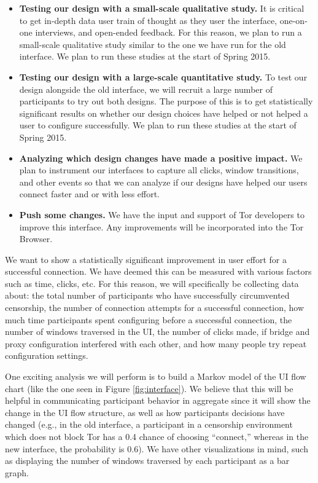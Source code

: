 \documentclass{template}
\begin{document}
\begin{itemize} \itemsep1pt \parskip0pt  
\item {\bfseries Testing our design with a small-scale qualitative study.} It is critical to get in-depth data user train of thought as they user the interface, one-on-one interviews, and open-ended feedback. For this reason, we plan to run a small-scale qualitative study similar to the one we have run for the old interface. We plan to run these studies at the start of Spring 2015. 
\item {\bfseries Testing our design with a large-scale quantitative study.} To test our design alongside the old interface, we will recruit a large number of participants to try out both designs. The purpose of this is to get statistically significant results on whether our design choices have helped or not helped a user to configure successfully. We plan to run these studies at the start of Spring 2015.
\item {\bfseries Analyzing which design changes have made a positive impact.} We plan to instrument our interfaces to capture all clicks, window transitions, and other events so that we can analyze if our designs have helped our users connect faster and or with less effort. 
\item {\bfseries Push some changes.} We have the input and support of Tor developers
to improve this interface. Any improvements will be incorporated into the Tor Browser.
\end{itemize}

 We want to show a statistically significant improvement in user effort for a successful connection. We have deemed this can be measured with various factors such as time, clicks, etc. For this reason, we will specifically be collecting data about: the total number of participants who have successfully circumvented censorship, the number of connection attempts for a successful connection, how much time participants spent configuring before a successful connection, the number of windows traversed in the UI, the number of clicks made, if bridge and proxy configuration interfered with each other, and how many people try repeat configuration settings. 

One exciting analysis we will perform is to build a Markov model of the UI flow chart (like the one seen in Figure \ref{fig:interface}). We believe that this will be helpful in communicating participant behavior in aggregate since it will show the change in the UI flow structure, as well as how participants decisions have changed (e.g., in the old interface, a participant in a censorship environment which does not block Tor has a 0.4 chance of choosing ``connect,'' whereas in the new interface, the probability is 0.6). We have other visualizations in mind, such as displaying the number of windows traversed by each participant as a bar graph.\\
\end{document}
